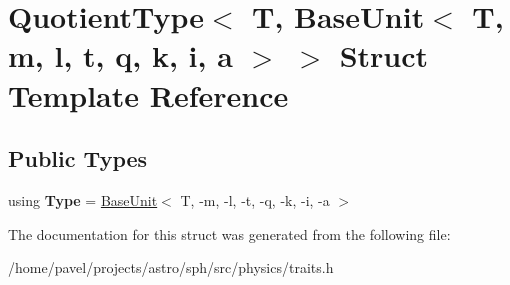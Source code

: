 \hypertarget{structQuotientType_3_01T_00_01BaseUnit_3_01T_00_01m_00_01l_00_01t_00_01q_00_01k_00_01i_00_01a_01_4_01_4}{}\section{Quotient\+Type$<$ T, Base\+Unit$<$ T, m, l, t, q, k, i, a $>$ $>$ Struct Template Reference}
\label{structQuotientType_3_01T_00_01BaseUnit_3_01T_00_01m_00_01l_00_01t_00_01q_00_01k_00_01i_00_01a_01_4_01_4}
\subsection*{Public Types}
\begin{DoxyCompactItemize}
\item 
\hypertarget{structQuotientType_3_01T_00_01BaseUnit_3_01T_00_01m_00_01l_00_01t_00_01q_00_01k_00_01i_00_01a_01_4_01_4_a91649ef6f46bff6ef5c6427a7fa8963a}{}\label{structQuotientType_3_01T_00_01BaseUnit_3_01T_00_01m_00_01l_00_01t_00_01q_00_01k_00_01i_00_01a_01_4_01_4_a91649ef6f46bff6ef5c6427a7fa8963a} 
using {\bfseries Type} = \hyperlink{classBaseUnit}{Base\+Unit}$<$ T, -\/m, -\/l, -\/t, -\/q, -\/k, -\/i, -\/a $>$
\end{DoxyCompactItemize}


The documentation for this struct was generated from the following file\+:\begin{DoxyCompactItemize}
\item 
/home/pavel/projects/astro/sph/src/physics/traits.\+h\end{DoxyCompactItemize}
